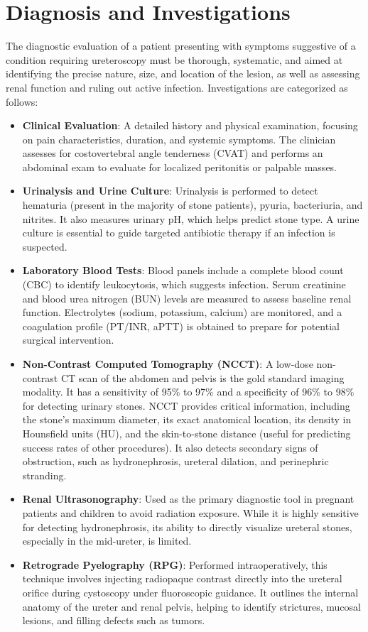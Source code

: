 \section*{Diagnosis and Investigations}
The diagnostic evaluation of a patient presenting with symptoms suggestive of a condition requiring ureteroscopy must be thorough, systematic, and aimed at identifying the precise nature, size, and location of the lesion, as well as assessing renal function and ruling out active infection.
Investigations are categorized as follows:
\begin{itemize}
\item \textbf{Clinical Evaluation}: A detailed history and physical examination, focusing on pain characteristics, duration, and systemic symptoms. The clinician assesses for costovertebral angle tenderness (CVAT) and performs an abdominal exam to evaluate for localized peritonitis or palpable masses.
\item \textbf{Urinalysis and Urine Culture}: Urinalysis is performed to detect hematuria (present in the majority of stone patients), pyuria, bacteriuria, and nitrites. It also measures urinary pH, which helps predict stone type. A urine culture is essential to guide targeted antibiotic therapy if an infection is suspected.
\item \textbf{Laboratory Blood Tests}: Blood panels include a complete blood count (CBC) to identify leukocytosis, which suggests infection. Serum creatinine and blood urea nitrogen (BUN) levels are measured to assess baseline renal function. Electrolytes (sodium, potassium, calcium) are monitored, and a coagulation profile (PT/INR, aPTT) is obtained to prepare for potential surgical intervention.
\item \textbf{Non-Contrast Computed Tomography (NCCT)}: A low-dose non-contrast CT scan of the abdomen and pelvis is the gold standard imaging modality. It has a sensitivity of 95\% to 97\% and a specificity of 96\% to 98\% for detecting urinary stones. NCCT provides critical information, including the stone's maximum diameter, its exact anatomical location, its density in Hounsfield units (HU), and the skin-to-stone distance (useful for predicting success rates of other procedures). It also detects secondary signs of obstruction, such as hydronephrosis, ureteral dilation, and perinephric stranding.
\item \textbf{Renal Ultrasonography}: Used as the primary diagnostic tool in pregnant patients and children to avoid radiation exposure. While it is highly sensitive for detecting hydronephrosis, its ability to directly visualize ureteral stones, especially in the mid-ureter, is limited.
\item \textbf{Retrograde Pyelography (RPG)}: Performed intraoperatively, this technique involves injecting radiopaque contrast directly into the ureteral orifice during cystoscopy under fluoroscopic guidance. It outlines the internal anatomy of the ureter and renal pelvis, helping to identify strictures, mucosal lesions, and filling defects such as tumors.
\end{itemize}


